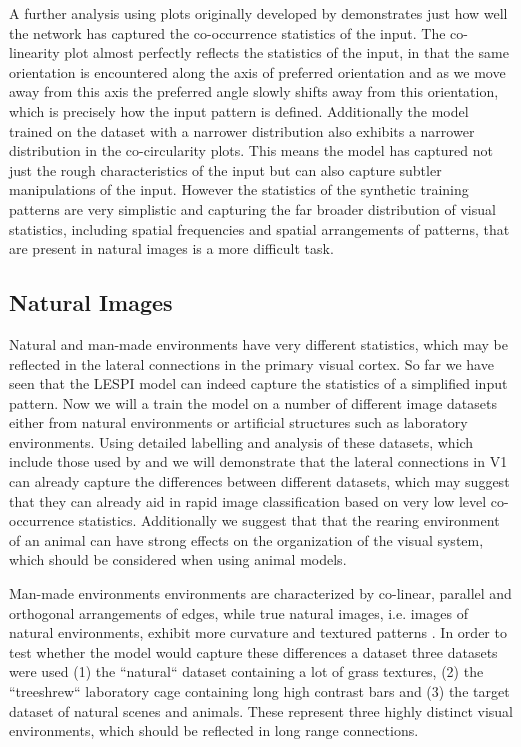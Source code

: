 A further analysis using plots originally developed by
\cite{Geisler2001} demonstrates just how well the network has captured
the co-occurrence statistics of the input. The co-linearity plot
almost perfectly reflects the statistics of the input, in that the
same orientation is encountered along the axis of preferred
orientation and as we move away from this axis the preferred angle
slowly shifts away from this orientation, which is precisely how the
input pattern is defined. Additionally the model trained on the
dataset with a narrower distribution also exhibits a narrower
distribution in the co-circularity plots. This means the model has
captured not just the rough characteristics of the input but can also
capture subtler manipulations of the input. However the statistics of
the synthetic training patterns are very simplistic and capturing the
far broader distribution of visual statistics, including spatial
frequencies and spatial arrangements of patterns, that are present in
natural images is a more difficult task.

\subsection{Natural Images}

Natural and man-made environments have very different statistics,
which may be reflected in the lateral connections in the primary
visual cortex. So far we have seen that the LESPI model can indeed
capture the statistics of a simplified input pattern. Now we will a
train the model on a number of different image datasets either from
natural environments or artificial structures such as laboratory
environments. Using detailed labelling and analysis of these datasets,
which include those used by \citep{Perrinet2015} and \citep{Serre2007}
we will demonstrate that the lateral connections in V1 can already
capture the differences between different datasets, which may suggest
that they can already aid in rapid image classification based on very
low level co-occurrence statistics. Additionally we suggest that that
the rearing environment of an animal can have strong effects on the
organization of the visual system, which should be considered when
using animal models.

Man-made environments environments are characterized by co-linear,
parallel and orthogonal arrangements of edges, while true natural
images, i.e. images of natural environments, exhibit more curvature
and textured patterns \citep{Perrinet2015}. In order to test whether
the model would capture these differences a dataset three datasets
were used (1) the ``natural`` dataset containing a lot of grass
textures, (2) the ``treeshrew`` laboratory cage containing long high
contrast bars and (3) the \citep{Serre2007} target dataset of natural
scenes and animals. These represent three highly distinct visual
environments, which should be reflected in long range connections.


